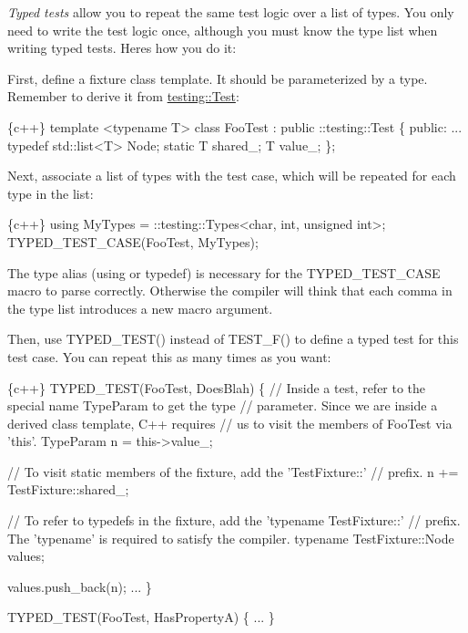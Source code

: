 {\itshape Typed tests} allow you to repeat the same test logic over a list of types. You only need to write the test logic once, although you must know the type list when writing typed tests. Here\textquotesingle{}s how you do it\+:

First, define a fixture class template. It should be parameterized by a type. Remember to derive it from {\ttfamily \hyperlink{classtesting_1_1Test}{testing\+::\+Test}}\+:


\begin{DoxyCode}
\{c++\}
template <typename T>
class FooTest : public ::testing::Test \{
 public:
  ...
  typedef std::list<T> Node;
  static T shared\_;
  T value\_;
\};
\end{DoxyCode}


Next, associate a list of types with the test case, which will be repeated for each type in the list\+:


\begin{DoxyCode}
\{c++\}
using MyTypes = ::testing::Types<char, int, unsigned int>;
TYPED\_TEST\_CASE(FooTest, MyTypes);
\end{DoxyCode}


The type alias ({\ttfamily using} or {\ttfamily typedef}) is necessary for the {\ttfamily T\+Y\+P\+E\+D\+\_\+\+T\+E\+S\+T\+\_\+\+C\+A\+SE} macro to parse correctly. Otherwise the compiler will think that each comma in the type list introduces a new macro argument.

Then, use {\ttfamily T\+Y\+P\+E\+D\+\_\+\+T\+E\+S\+T()} instead of {\ttfamily T\+E\+S\+T\+\_\+\+F()} to define a typed test for this test case. You can repeat this as many times as you want\+:


\begin{DoxyCode}
\{c++\}
TYPED\_TEST(FooTest, DoesBlah) \{
  // Inside a test, refer to the special name TypeParam to get the type
  // parameter.  Since we are inside a derived class template, C++ requires
  // us to visit the members of FooTest via 'this'.
  TypeParam n = this->value\_;

  // To visit static members of the fixture, add the 'TestFixture::'
  // prefix.
  n += TestFixture::shared\_;

  // To refer to typedefs in the fixture, add the 'typename TestFixture::'
  // prefix.  The 'typename' is required to satisfy the compiler.
  typename TestFixture::Node values;

  values.push\_back(n);
  ...
\}

TYPED\_TEST(FooTest, HasPropertyA) \{ ... \}
\end{DoxyCode}


